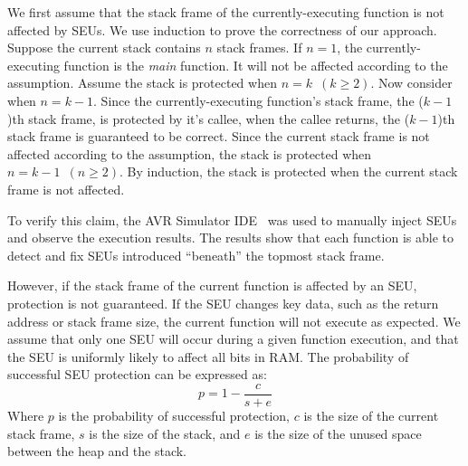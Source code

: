 We first assume that the stack frame of the currently-executing function is not affected by SEUs. We use induction to prove the correctness of our approach. Suppose the current stack contains $n$ stack frames. If $n=1$, the currently-executing function is the \textit{main} function. It will not be affected according to the assumption. Assume the stack is protected when $n=k\enspace(k\geq2)$. Now consider when $n=k-1$. Since the currently-executing function's stack frame, the ($k-1$)th stack frame, is protected by it's callee, when the callee returns, the ($k-1$)th stack frame is guaranteed to be correct. Since the current stack frame is not affected according to the assumption, the stack is protected when $n=k-1\enspace (n\geq2)$. By induction, the stack is protected when the current stack frame is not affected.%

To verify this claim, the AVR Simulator IDE~\cite{avrsimide} was used to manually inject SEUs and observe the execution results. The results show that each function is able to detect and fix SEUs introduced ``beneath'' the topmost stack frame.

However, if the stack frame of the current function is affected by an SEU, protection is not guaranteed. If the SEU changes key data, such as the return address or stack frame size, the current function will not execute as expected. We assume that only one SEU will occur during a given function execution, and that the SEU is uniformly likely to affect all bits in RAM. The probability of successful SEU protection can be expressed as:
\begin{equation}\label{eq_seu1}
p=1-\frac{c}{s+e}
\end{equation}
Where $p$ is the probability of successful protection, $c$ is the size of the current stack frame, $s$ is the size of the stack, and $e$ is the size of the unused space between the heap and the stack.

